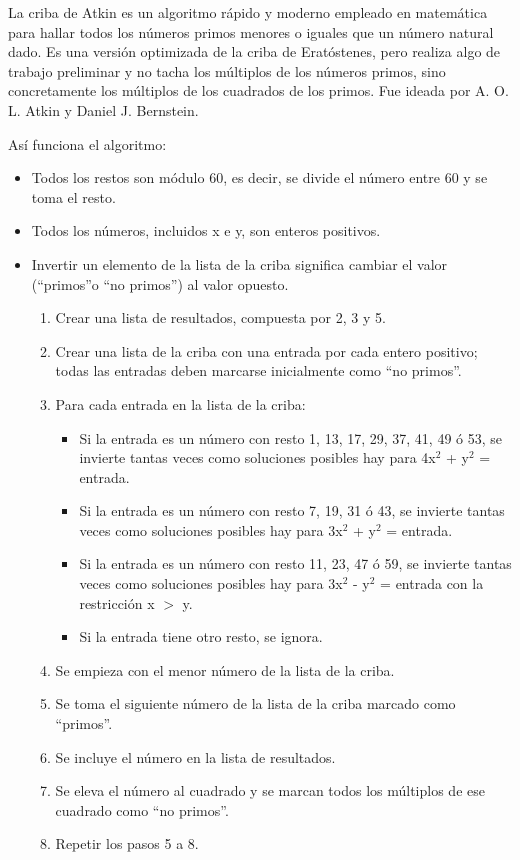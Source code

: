 La criba de Atkin es un algoritmo rápido y moderno empleado en matemática para hallar todos los números primos menores o iguales que un número natural dado. Es una versión optimizada de la criba de Eratóstenes, pero realiza algo de trabajo preliminar y no tacha los múltiplos de los números primos, sino concretamente los múltiplos de los cuadrados de los primos. Fue ideada por A. O. L. Atkin y Daniel J. Bernstein.

Así funciona el algoritmo:
\begin{itemize}
	\item Todos los restos son módulo 60, es decir, se divide el número entre 60 y se toma el resto.
	\item Todos los números, incluidos x e y, son enteros positivos.
	\item Invertir un elemento de la lista de la criba significa cambiar el valor (\textquotedblleft primos\textquotedblright o \textquotedblleft no primos\textquotedblright) al valor opuesto.
	\begin{enumerate}
		\item Crear una lista de resultados, compuesta por 2, 3 y 5.
		\item Crear una lista de la criba con una entrada por cada entero positivo; todas las entradas deben marcarse inicialmente como \textquotedblleft no primos\textquotedblright.
		\item Para cada entrada en la lista de la criba: 
		\begin{itemize}
			\item Si la entrada es un número con resto 1, 13, 17, 29, 37, 41, 49 ó 53, se invierte tantas veces como soluciones posibles hay para 4x$^{2}$ + y$^{2}$ = entrada.
			\item Si la entrada es un número con resto 7, 19, 31 ó 43, se invierte tantas veces como soluciones posibles hay para 3x$^{2}$ + y$^{2}$ = entrada.
			\item Si la entrada es un número con resto 11, 23, 47 ó 59, se invierte tantas veces como soluciones posibles hay para 3x$^{2}$ - y$^{2}$ = entrada con la restricción x $>$ y.
			\item Si la entrada tiene otro resto, se ignora.
		\end{itemize}
		\item Se empieza con el menor número de la lista de la criba.
		\item Se toma el siguiente número de la lista de la criba marcado como \textquotedblleft primos\textquotedblright.
		\item Se incluye el número en la lista de resultados.
		\item Se eleva el número al cuadrado y se marcan todos los múltiplos de ese cuadrado como \textquotedblleft no primos\textquotedblright.
		\item Repetir los pasos 5 a 8.
	\end{enumerate}
\end{itemize}

